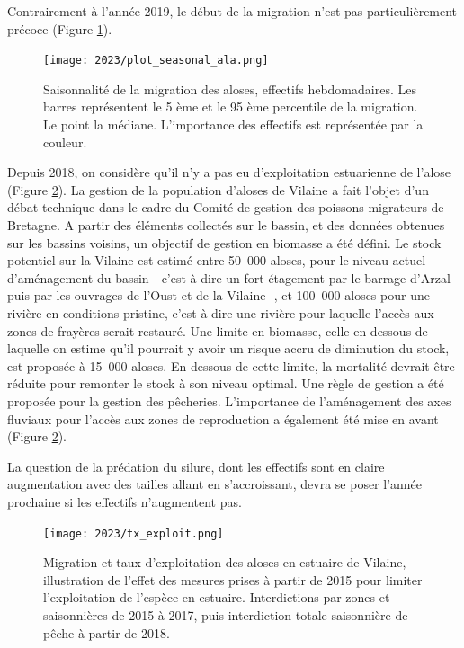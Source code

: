 \documentclass[11pt,twocolumn,titlepage,twoside]{article}\usepackage[]{graphicx}\usepackage[]{color}
\begin{document}
Contrairement à l'année 2019, le début de la migration n'est pas
particulièrement précoce (Figure \ref{plot_seasonal_ala}).




\begin{figure}[htpb]
\centering
\texttt{[image: 2023/plot\_seasonal\_ala.png]} 
\caption{Saisonnalité de la migration des aloses, effectifs hebdomadaires. Les
barres représentent le 5 ème et le 95 ème percentile de la migration. Le point
la médiane. L'importance des effectifs est représentée par la couleur.}
\label{plot_seasonal_ala}
\end{figure}

Depuis 2018, on considère qu'il n'y a pas eu d'exploitation
estuarienne de l'alose (Figure \ref{tx_exploit}). La gestion de la population d'aloses
de Vilaine a fait l'objet d'un
débat technique dans le cadre du Comité de gestion des poissons migrateurs de
Bretagne.
A partir des éléments collectés sur le bassin, et des données obtenues sur les
bassins voisins, un objectif de gestion en biomasse a été défini. Le
stock potentiel sur la Vilaine est estimé entre 50~000 aloses, pour
le niveau actuel d'aménagement du bassin - c'est à dire un fort étagement
par le barrage d'Arzal puis par les ouvrages de l'Oust et de la Vilaine- , et
100~000 aloses pour une rivière en conditions pristine, c'est à dire une
rivière pour laquelle l'accès aux zones de frayères serait restauré. Une limite
en biomasse, celle en-dessous de laquelle on estime qu'il pourrait y avoir un
risque accru de diminution du stock, est proposée à 15~000 aloses. En dessous de
cette limite, la mortalité devrait être réduite pour remonter le stock à son
niveau optimal. Une règle de gestion a été proposée pour la gestion des
pêcheries. L'importance de l'aménagement des axes fluviaux pour l'accès aux
zones de reproduction a également été mise en avant (Figure \ref{tx_exploit}).

La question de la prédation du silure, dont les effectifs
sont en claire augmentation avec des tailles allant en s'accroissant, devra se poser l'année
prochaine si les effectifs n'augmentent pas.


\vfill
\begin{figure}[pbt]
\centering
\texttt{[image: 2023/tx\_exploit.png]} 
\caption{Migration et taux d'exploitation des aloses en estuaire de Vilaine,
illustration de l'effet des mesures prises à partir de 2015 pour limiter
l'exploitation de l'espèce en estuaire. Interdictions par zones et saisonnières
de 2015 à 2017, puis interdiction totale saisonnière de pêche à partir de 2018.}
\label{tx_exploit}
\end{figure}
\newpage %
\end{document}
